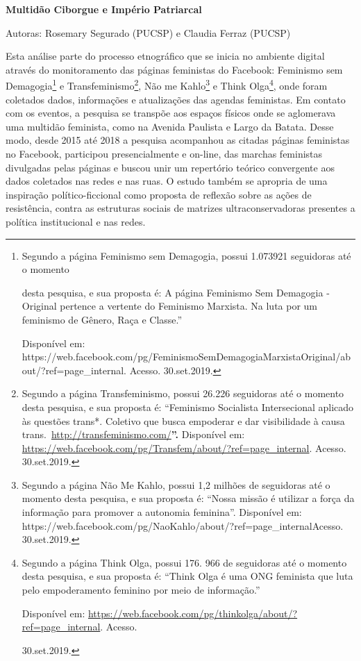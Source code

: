 \textbf{Multidão Ciborgue e Império Patriarcal}

Autoras: Rosemary Segurado (PUCSP) e Claudia Ferraz (PUCSP)

Esta análise parte do processo etnográfico que se inicia no ambiente
digital através do monitoramento das páginas feministas do Facebook:
Feminismo sem Demagogia\footnote{Segundo a página Feminismo sem
  Demagogia, possui 1.073921 seguidoras até o momento

  desta pesquisa, e sua proposta é: A página Feminismo Sem Demagogia -
  Original pertence a vertente do Feminismo Marxista. Na luta por um
  feminismo de Gênero, Raça e Classe.''

  Disponível em:
  https://web.facebook.com/pg/FeminismoSemDemagogiaMarxistaOriginal/about/?ref=page\_internal.
  Acesso. 30.set.2019.} e Transfeminismo\footnote{Segundo a página
  Transfeminismo, possui 26.226 seguidoras até o momento desta pesquisa,
  e sua proposta é: ``Feminismo Socialista Intersecional aplicado às
  questões trans*. Coletivo que busca empoderar e dar visibilidade à
  causa
  trans.~\href{http://transfeminismo.com/?fbclid=IwAR0qs0NTNcomXjv1xI35pnJWIObIfHSx7ZvJsRAHeQi0vKkatHKRPguS4rU}{http://transfeminismo.com/}\textbf{''.}
  Disponível em:
  \url{https://web.facebook.com/pg/Transfem/about/?ref=page_internal}.
  Acesso. 30.set.2019.}, Não me Kahlo\footnote{Segundo a página Não Me
  Kahlo, possui 1,2 milhões de seguidoras até o momento desta pesquisa,
  e sua proposta é: ``Nossa missão é utilizar a força da informação para
  promover a autonomia feminina''. Disponível em:
  https://web.facebook.com/pg/NaoKahlo/about/?ref=page\_internalAcesso.
  30.set.2019.} e Think Olga\footnote{Segundo a página Think Olga,
  possui 176. 966 de seguidoras até o momento desta pesquisa, e sua
  proposta é: ``Think Olga é uma ONG feminista que luta pelo
  empoderamento feminino por meio de informação.''

  Disponível em:
  \url{https://web.facebook.com/pg/thinkolga/about/?ref=page_internal}.
  Acesso.

  30.set.2019.}, onde foram coletados dados, informações e atualizações
das agendas feministas. Em contato com os eventos, a pesquisa se
transpõe aos espaços físicos onde se aglomerava uma multidão feminista,
como na Avenida Paulista e Largo da Batata. Desse modo, desde 2015 até
2018 a pesquisa acompanhou as citadas páginas feministas no Facebook,
participou presencialmente e on-line, das marchas feministas divulgadas
pelas páginas e buscou unir um repertório teórico convergente aos dados
coletados nas redes e nas ruas. O estudo também se apropria de uma
inspiração político-ficcional como proposta de reflexão sobre as ações
de resistência, contra as estruturas sociais de matrizes
ultraconservadoras presentes a política institucional e nas redes.

